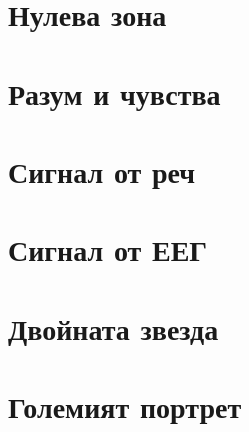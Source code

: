 \chapter{Нулева зона}

\chapter{Разум и чувства}

\chapter{Сигнал от реч}
\label{chap:speech}
    
    
    
    
    
    
\chapter{Сигнал от ЕЕГ}
    
    
    
    
\chapter{Двойната звезда}
    
\chapter{Големият портрет}
\begin{appendices}
    
    
    
    
\end{appendices}
\printbibliography[heading=bibintoc]